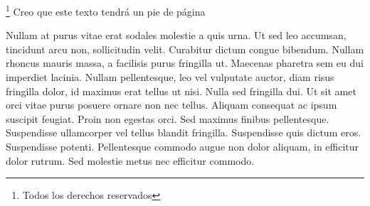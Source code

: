 \documentclass{report}
\begin{document}
    \footnote{Todos los derechos reservados} Creo que este texto tendrá un pie de página

    Nullam at purus vitae erat sodales molestie a quis urna. Ut sed leo accumsan, tincidunt arcu non, sollicitudin velit. Curabitur dictum congue bibendum. Nullam rhoncus mauris massa, a facilisis purus fringilla ut. Maecenas pharetra sem eu dui imperdiet lacinia. Nullam pellentesque, leo vel vulputate auctor, diam risus fringilla dolor, id maximus erat tellus ut nisi. Nulla sed fringilla dui. Ut sit amet orci vitae purus posuere ornare non nec tellus. Aliquam consequat ac ipsum suscipit feugiat. Proin non egestas orci. Sed maximus finibus pellentesque. Suspendisse ullamcorper vel tellus blandit fringilla. Suspendisse quis dictum eros. Suspendisse potenti. Pellentesque commodo augue non dolor aliquam, in efficitur dolor rutrum. Sed molestie metus nec efficitur commodo.
\end{document}
